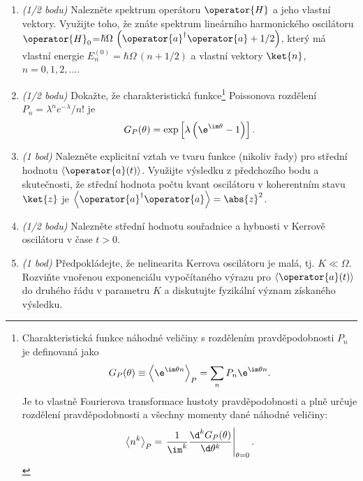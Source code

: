 \documentclass[a4paper,11pt,twoside]{book}
\begin{document}
    \begin{enumerate}
        \item \emph{(1/2 bodu)}
            Nalezněte spektrum operátoru $\operator{H}$ a jeho vlastní vektory.
            Využijte toho, že znáte spektrum lineárního harmonického oscilátoru $\operator{H}_{0}$=$\hbar\Omega\,\left(\operator{a}^{\dagger}\operator{a}+1/2\right)$, který má vlastní energie $E_{n}^{(0)}=\hbar\Omega\,\left(n+1/2\right)$ a vlastní vektory $\ket{n}$, $n=0,1,2,\dotsc$.

        \item \emph{(1/2 bodu)}
            Dokažte, že charakteristická funkce\footnote{
            Charakteristická funkce náhodné veličiny s rozdělením pravděpodobnosti $P_n$ je definovaná jako
            \begin{equation*}
                G_{P}(\theta)\equiv\left\langle \e^{\im\theta n}\right\rangle_{P}=\sum_{n}P_{n}\e^{\im\theta n}.
            \end{equation*}
            Je to vlastně Fourierova transformace hustoty pravděpodobnosti a plně určuje rozdělení pravděpodobnosti a všechny momenty dané náhodné veličiny:
            \begin{equation*}
                \left\langle n^{k}\right\rangle_{P}
                    =\left.\frac{1}{\im^{k}}\frac{\d^{k}G_{P}(\theta)}{\d\theta^{k}}\right|_{\theta=0}.
            \end{equation*}
        } Poissonova rozdělení $P_{n}=\lambda^{n}e^{-\lambda}/n!$ je
        \begin{equation*}
            G_{P}(\theta)=\exp\left[\lambda\left(\e^{\im\theta}-1\right)\right].
        \end{equation*}

        \item\emph{(1 bod)}
            Nalezněte explicitní vztah ve tvaru funkce (nikoliv řady) pro střední hodnotu $\left\langle\operator{a}(t)\right\rangle$.
            Využijte výsledku z předchozího bodu a skutečnosti, že střední hodnota počtu kvant oscilátoru v koherentním stavu $\ket{z}$ je $\left\langle \operator{a}^{\dagger}\operator{a}\right\rangle=\abs{z}^{2}$.

        \item\emph{(1/2 bodu)}
            Nalezněte střední hodnotu souřadnice a hybnosti v Kerrově oscilátoru v čase $t>0$.

        \item\emph{(1 bod)} 
            Předpokládejte, že nelinearita Kerrova oscilátoru je malá, tj. $K\ll\Omega$.
            Rozviňte {\color{red} vnořenou exponenciálu} vypočítaného výrazu pro $\left\langle\operator{a}(t)\right\rangle$ do druhého řádu v parametru $K$ a diskutujte fyzikální význam získaného výsledku.


\end{enumerate}
\end{document}
